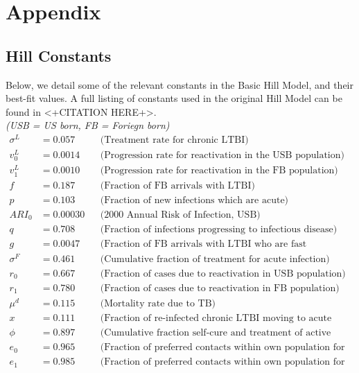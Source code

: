 \documentclass{amsart}
\begin{document}
\section{Appendix} 
\subsection{Hill Constants}
\label{subsec:hillConstants}
Below, we detail some of the relevant constants in the Basic Hill Model, and
their best-fit values. A full listing of constants used in the original Hill
Model can be found in <+CITATION HERE+>. \\
\textit{(USB = US born, FB = Foriegn born)}
\begin{align*}
  \sigma^{L} &= 0.057   &&\text{(Treatment rate for chronic LTBI)}\\
  v^{L}_{0}  &= 0.0014  &&\text{(Progression rate for reactivation in the USB
                                 population)}\\
  v^{L}_{1}  &= 0.0010  &&\text{(Progression rate for reactivation in the FB
                                 population)}\\
  f          &= 0.187   &&\text{(Fraction of FB arrivals with LTBI)}\\
  p          &= 0.103   &&\text{(Fraction of new infections which are acute)}\\
  ARI_{0}    &= 0.00030 &&\text{(2000 Annual Risk of Infection, USB)}\\
  q          &= 0.708   &&\text{(Fraction of infections progressing to infectious
                                 disease)}\\
  g          &= 0.0047  &&\text{(Fraction of FB arrivals with LTBI who are fast
                                 progressors)}\\
  \sigma^{F} &= 0.461   &&\text{(Cumulative fraction of treatment for acute
                                 infection)}\\
  r_{0}      &= 0.667   &&\text{(Fraction of cases due to reactivation in USB
                                 population)}\\
  r_{1}      &= 0.780   &&\text{(Fraction of cases due to reactivation in FB
                                 population)}\\
  \mu^{d}    &= 0.115   &&\text{(Mortality rate due to TB)}\\
  x          &= 0.111   &&\text{(Fraction of re-infected chronic LTBI moving to
                                 acute infection)}\\
  \phi       &= 0.897   &&\text{(Cumulative fraction self-cure and treatment of
                                 active disease)}\\
  e_{0}      &= 0.965   &&\text{(Fraction of preferred contacts within own
                                 population for USB)}\\
  e_{1}      &= 0.985   &&\text{(Fraction of preferred contacts within own
                                population for FB)}\\
\end{align*}
\end{document}
